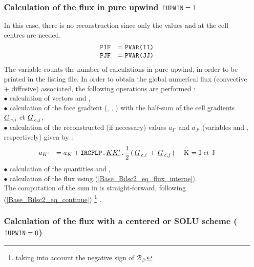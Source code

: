 \subsubsection*{\bf Calculation of the flux in pure upwind $\text{\texttt{IUPWIN}} = 1$}

In this case, there is no reconstruction since only
the values  and  at the cell centres are needed.
\begin{equation}
\begin{array}{ll}
\text{\texttt{PIF}} &= \text{\texttt{PVAR(II)}} \\
\text{\texttt{PJF}} &= \text{\texttt{PVAR(JJ)}} \\
\end{array}
\end{equation}
The variable  counts the number of calculations in pure upwind,
in order to be printed in the listing file.
In order to obtain the global numerical flux  (convective + diffusive)
associated, the following operations are performed :\\
$\bullet$ calculation of vectors  and ,\\
$\bullet$ calculation of the face gradient (, , ) with the half-sum of the cell gradients $\underline{G}_{\,c,i}$ et $\underline{G}_{\,c,j}$,\\
$\bullet$ calculation of the reconstructed (if necessary) values $a_{I'}$ and  $a_{J'}$ (variables  and , respectively) given by :
\begin{equation}\label{Base_Bilsc2_Eq_Rec_Dif1}
\begin{array}{lll}
a_{K'}&= a_K +  \text{\texttt{IRCFLP}}\,.\,\underline{KK'}\,.\,\displaystyle\frac{1}{2}\,(\,\underline{G}_{\,c,i}\,+\,\underline{G}_{\,c,j}\,)&\text{ K = I et J}\\
\end{array}
\end{equation}
$\bullet$ calculation of the quantities  and ,\\
$\bullet$ calculation of the flux  using (\ref{Base_Bilsc2_eq_flux_interne}).\\
The computation of the sum in  is straight-forward, following (\ref{Base_Bilsc2_eq_continue})
\footnote{ taking into account the negative sign of $\mathcal{B_{\mathcal{\beta}}}$.} .
\subsubsection*{\bf Calculation of the flux with a centered or SOLU scheme ($\text{\texttt{IUPWIN}} = 0$)}

